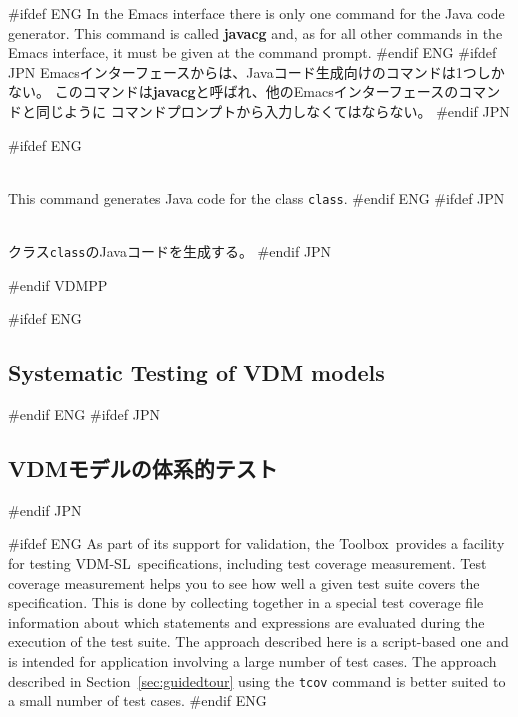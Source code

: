 \documentclass[\pformat,12pt]{article}
\newcommand{\vdmslpp}{VDM-SL}
\newcommand{\Toolbox}{Toolbox}
\newcommand{\vdmslpp}{VDM++}
\newcommand{\Toolbox}{Toolbox}
\begin{document}
#ifdef ENG
In the Emacs interface there is only one command for the Java code generator.
This command is called \textbf{javacg}
and, as for all other commands in the Emacs interface, it must be given at
the command prompt.
#endif ENG
#ifdef JPN
Emacsインターフェースからは、Javaコード生成向けのコマンドは1つしかない。
このコマンドは\textbf{javacg}と呼ばれ、他のEmacsインターフェースのコマンドと同じように
コマンドプロンプトから入力しなくてはならない。
#endif JPN

\begin{description}
#ifdef ENG
\item[*javacg (jcg) {\tt class} {[}{\tt options}{]}]   \mbox{}\\
  This command generates Java code for the class {\tt class}.
#endif ENG
#ifdef JPN
\item[*javacg (jcg) {\tt class} {[}{\tt options}{]}] 
  \mbox{}\\
  クラス{\tt class}のJavaコードを生成する。
#endif JPN
\end{description}
#endif VDMPP

\newpage
#ifdef ENG
\subsection{Systematic Testing of VDM models}\label{sec:testing}
\label{vdmtc} 
#endif ENG
#ifdef JPN
\subsection{VDMモデルの体系的テスト}\label{sec:testing}
\label{vdmtc} 
#endif JPN

#ifdef ENG
As part of its support for validation, the \Toolbox\ provides a
facility for testing \vdmslpp\ specifications, including test
  coverage measurement.  Test coverage measurement helps you to see
how well a given test suite covers the
specification. This is done by collecting together in a special 
test coverage file information  about which
statements and expressions are 
evaluated during the execution of the test suite. The approach
described here is a script-based one and is intended for application
involving a large number of test cases. The approach described in
Section~\ref{sec:guidedtour} using the \texttt{tcov} command is better
suited to a small number of test cases.
#endif ENG
\end{document}
